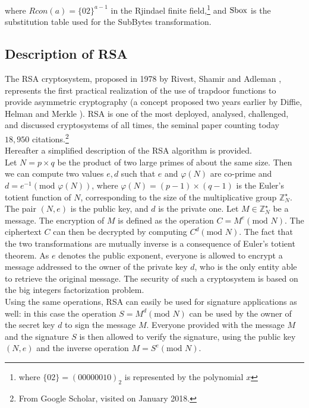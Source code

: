 where $Rcon(a) = \{02\}^{a-1}$ in the Rjindael finite field,\footnote{where $\{02\}=(00000010)_2$ is represented by the polynomial $x$} and $\mathrm{Sbox}$ is the substitution table used for the SubBytes transformation.

\subsection{Description of RSA}
The RSA cryptosystem, proposed in 1978 by Rivest, Shamir and Adleman \cite{rivest1978method}, represents the first practical realization of the use of trapdoor functions to provide asymmetric cryptography (a concept proposed two years earlier by Diffie, Helman and Merkle \cite{diffie1976new}). RSA is one of the most deployed, analysed, challenged, and discussed cryptosystems of all times, the seminal paper \cite{rivest1978method} counting today $18,950$ citations.\footnote{From Google Scholar, visited on January 2018.}\\

Hereafter a simplified description of the RSA algorithm is provided.\\
Let $N = p \times q$ be the product of two large primes of about the same size. Then we can compute two values $e,d$ such that $e$ and $\varphi(N)$ are co-prime and $d = e^{-1} (\mbox{mod } \varphi(N))$, where $\varphi(N) = (p-1)\times(q-1)$ is the Euler's totient function of $N$, corresponding to the size of the multiplicative group $	\mathbb{Z}^\star_N$. The pair $(N,e)$ is the public key, and $d$ is the private one. Let $M \in	\mathbb{Z}^\star_N$ be a message. The encryption of $M$ is defined as the operation $C = M^e (\mbox{mod } N)$. The ciphertext $C$ can then be decrypted by computing $C^d (\mbox{mod } N)$. The fact that the two transformations are mutually inverse is a consequence of Euler's totient theorem. As $e$ denotes the public exponent, everyone is allowed to encrypt a message addressed to the owner of the private key $d$, who is the only entity able to retrieve the original message. The security of such a cryptosystem is based on the big integers factorization problem.\\
Using the same operations, RSA can easily be used for signature applications as well: in this case the operation $S = M^d (\mbox{mod } N)$ can be used by the owner of the secret key $d$ to sign the message $M$. Everyone provided with the message $M$ and the signature $S$ is then allowed to verify the signature, using the public key $(N,e)$ and the inverse operation $M = S^e (\mbox{mod } N)$.


